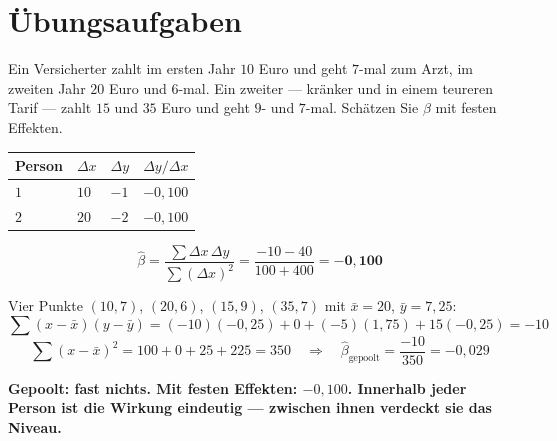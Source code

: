 \section{Übungsaufgaben}

\begin{aufgabe}
Ein Versicherter zahlt im ersten Jahr $10$ Euro und geht $7$-mal zum Arzt, im zweiten Jahr $20$ Euro und $6$-mal. Ein zweiter --- kränker und in einem teureren Tarif --- zahlt $15$ und $35$ Euro und geht $9$- und $7$-mal. Schätzen Sie $\beta$ mit festen Effekten.

\loesung
{}
\begin{center}
{\small
\renewcommand{\arraystretch}{1.48}
\begin{tabular}{@{}P{1.6cm}P{2.0cm}P{2.0cm}P{2.4cm}@{}}
\toprule
\textbf{Person} & $\Delta x$ & $\Delta y$ & $\Delta y/\Delta x$\\
\midrule
$1$ & $10$ & $-1$ & $-0{,}100$\\
$2$ & $20$ & $-2$ & $-0{,}100$\\
\bottomrule
\end{tabular}}
\end{center}

\[ \hat\beta = \frac{\sum\Delta x\,\Delta y}{\sum(\Delta x)^{2}} = \frac{-10-40}{100+400} = \mathbf{-0{,}100} \]

Vier Punkte $(10,7)$, $(20,6)$, $(15,9)$, $(35,7)$ mit $\bar x = 20$, $\bar y = 7{,}25$:
\[ \sum(x-\bar x)(y-\bar y) = (-10)(-0{,}25)+0+(-5)(1{,}75)+15(-0{,}25) = -10 \]
\[ \sum(x-\bar x)^{2} = 100+0+25+225 = 350 \quad\Longrightarrow\quad \hat\beta_{\text{gepoolt}} = \frac{-10}{350} = -0{,}029 \]

\begin{center}
\begin{minipage}{0.9\textwidth}
\textbf{Gepoolt: fast nichts. Mit festen Effekten: $-0{,}100$. Innerhalb jeder Person ist die Wirkung eindeutig --- zwischen ihnen verdeckt sie das Niveau.}
\end{minipage}
\end{center}

\begin{center}
\begin{minipage}{0.88\textwidth}
\end{minipage}
\end{center}
\end{aufgabe}

